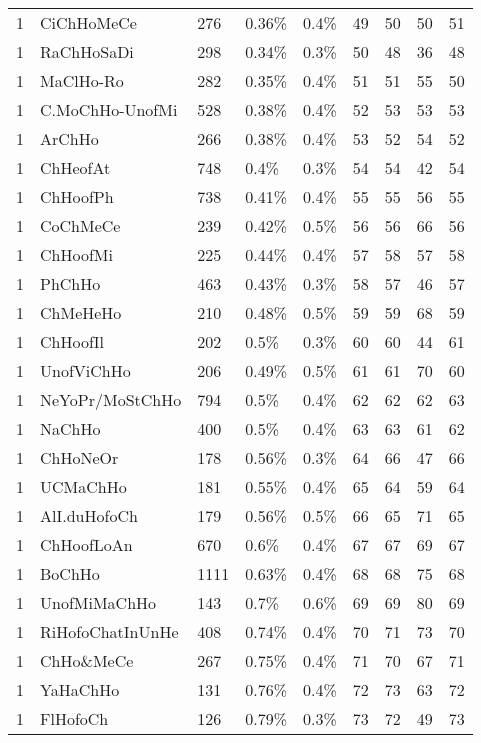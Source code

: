 \begin{longtable}{lllllrrrr}
  1 & CiChHoMeCe & 276 & 0.36\% & 0.4\% &  49 &  50 &  50 &  51 \\ 
  1 & RaChHoSaDi & 298 & 0.34\% & 0.3\% &  50 &  48 &  36 &  48 \\ 
  1 & MaClHo-Ro & 282 & 0.35\% & 0.4\% &  51 &  51 &  55 &  50 \\ 
  1 & C.MoChHo-UnofMi & 528 & 0.38\% & 0.4\% &  52 &  53 &  53 &  53 \\ 
  1 & ArChHo & 266 & 0.38\% & 0.4\% &  53 &  52 &  54 &  52 \\ 
  1 & ChHeofAt & 748 & 0.4\% & 0.3\% &  54 &  54 &  42 &  54 \\ 
  1 & ChHoofPh & 738 & 0.41\% & 0.4\% &  55 &  55 &  56 &  55 \\ 
  1 & CoChMeCe & 239 & 0.42\% & 0.5\% &  56 &  56 &  66 &  56 \\ 
  1 & ChHoofMi & 225 & 0.44\% & 0.4\% &  57 &  58 &  57 &  58 \\ 
  1 & PhChHo & 463 & 0.43\% & 0.3\% &  58 &  57 &  46 &  57 \\ 
  1 & ChMeHeHo & 210 & 0.48\% & 0.5\% &  59 &  59 &  68 &  59 \\ 
  1 & ChHoofIl & 202 & 0.5\% & 0.3\% &  60 &  60 &  44 &  61 \\ 
  1 & UnofViChHo & 206 & 0.49\% & 0.5\% &  61 &  61 &  70 &  60 \\ 
  1 & NeYoPr/MoStChHo & 794 & 0.5\% & 0.4\% &  62 &  62 &  62 &  63 \\ 
  1 & NaChHo & 400 & 0.5\% & 0.4\% &  63 &  63 &  61 &  62 \\ 
  1 & ChHoNeOr & 178 & 0.56\% & 0.3\% &  64 &  66 &  47 &  66 \\ 
  1 & UCMaChHo & 181 & 0.55\% & 0.4\% &  65 &  64 &  59 &  64 \\ 
  1 & AlI.duHofoCh & 179 & 0.56\% & 0.5\% &  66 &  65 &  71 &  65 \\ 
  1 & ChHoofLoAn & 670 & 0.6\% & 0.4\% &  67 &  67 &  69 &  67 \\ 
  1 & BoChHo & 1111 & 0.63\% & 0.4\% &  68 &  68 &  75 &  68 \\ 
  1 & UnofMiMaChHo & 143 & 0.7\% & 0.6\% &  69 &  69 &  80 &  69 \\ 
  1 & RiHofoChatInUnHe & 408 & 0.74\% & 0.4\% &  70 &  71 &  73 &  70 \\ 
  1 & ChHo\&MeCe & 267 & 0.75\% & 0.4\% &  71 &  70 &  67 &  71 \\ 
  1 & YaHaChHo & 131 & 0.76\% & 0.4\% &  72 &  73 &  63 &  72 \\ 
  1 & FlHofoCh & 126 & 0.79\% & 0.3\% &  73 &  72 &  49 &  73 \\ 

\end{longtable}
